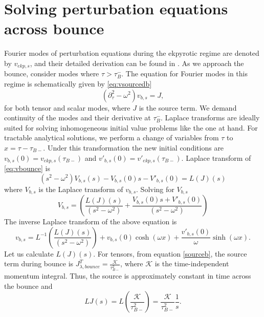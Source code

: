 \documentclass[12pt,a4paper]{article}
\numberwithin{equation}{section}
\numberwithin{equation}{section}
\begin{document}
\section{Solving perturbation equations across bounce}
\label{app:greens}
Fourier modes of perturbation equations during the ekpyrotic regime are denoted by $v_{ekp,s}$, and their detailed derivation can be found in \cite{Artymowski:2020pci,r1}. 
As we approach the bounce, consider modes where $\tau>\tau_B^-$. The equation for Fourier modes in this regime is schematically given by \eqref{eq:vsourcedb}
\begin{equation}
   (\partial^2_{\tau} - \omega^2)v_{b,s} = J,
   \label{eq:vbounce}
\end{equation}
for both tensor and scalar modes, where $J$ is the source term.
We demand continuity of the modes and their derivative at $\tau_B^-$. Laplace transforms are ideally suited for solving inhomogeneous initial value problems like the one at hand. For tractable analytical solutions, we perform a change of variables from $\tau$ to $x=\tau-\tau_{B-}$. Under this transformation the new initial conditions are $v_{b,s}(0)=v_{ekp,s}(\tau_{B-})$ and  $v'_{b,s}(0)=v'_{ekp,s}(\tau_{B-})$.
Laplace transform of \eqref{eq:vbounce} is 
\begin{equation}
   (s^2 - \omega^2)V_{b,s}(s)-V_{b,s}(0)s-V'_{b,s}(0) = L(J)(s)
   \label{eq:vbouncel}
\end{equation}
where $V_{b,s}$ is the Laplace transform of $v_{b,s}$. Solving for $V_{b,s}$
\begin{equation} \label{eq:LT}
    V_{b,s} =  \left(\frac{L(J)(s)}{ (s^2 - \omega^2)} + \frac{ V_{b,s}(0)s+V'_{b,s}(0)}{(s^2 - \omega^2)} \right)
\end{equation}
The inverse Laplace transform of the above equation is 
\begin{equation}
   v_{b,s} = L^{-1} \left(\frac{L(J)(s)}{ (s^2 - \omega^2)}\right) + v_{b,s}(0) \cosh(\omega x) + \frac{v'_{b,s}(0)}{\omega} \sinh(\omega x).
   \label{eq:vbouncef}
\end{equation}
Let us calculate $L(J)(s)$. For tensors, from equation \eqref{sourceb}, the source term during bounce is $J^T_{\lambda,bounce}=\frac{\mathcal{K}}{\tau^2_{B-}}$,
where $\mathcal{K}$ is the time-independent momentum integral. Thus, the source is approximately constant in time across the bounce and
\begin{equation}
   LJ(s) = L(\frac{\mathcal{K}}{\tau^2_{B-}}) = \frac{\mathcal{K}}{\tau^2_{B-}} \frac{1}{s}.
\end{equation}
\end{document}
